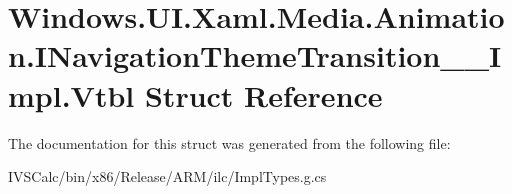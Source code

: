 \hypertarget{struct_windows_1_1_u_i_1_1_xaml_1_1_media_1_1_animation_1_1_i_navigation_theme_transition_____impl_1_1_vtbl}{}\section{Windows.\+U\+I.\+Xaml.\+Media.\+Animation.\+I\+Navigation\+Theme\+Transition\+\_\+\+\_\+\+Impl.\+Vtbl Struct Reference}
\label{struct_windows_1_1_u_i_1_1_xaml_1_1_media_1_1_animation_1_1_i_navigation_theme_transition_____impl_1_1_vtbl}


The documentation for this struct was generated from the following file\+:\begin{DoxyCompactItemize}
\item 
I\+V\+S\+Calc/bin/x86/\+Release/\+A\+R\+M/ilc/Impl\+Types.\+g.\+cs\end{DoxyCompactItemize}
